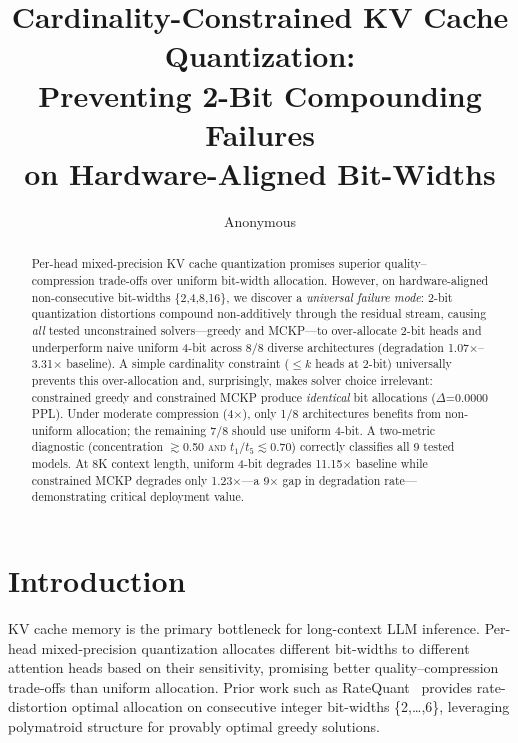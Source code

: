 \documentclass[11pt,a4paper]{article}
\title{Cardinality-Constrained KV Cache Quantization:\\Preventing 2-Bit Compounding Failures\\on Hardware-Aligned Bit-Widths}
\author{Anonymous}
\begin{document}
\maketitle

\begin{abstract}
Per-head mixed-precision KV cache quantization promises superior quality--compression trade-offs over uniform bit-width allocation.
However, on hardware-aligned non-consecutive bit-widths \{2,4,8,16\}, we discover a \emph{universal failure mode}: 2-bit quantization distortions compound non-additively through the residual stream, causing \emph{all} tested unconstrained solvers---greedy and MCKP---to over-allocate 2-bit heads and underperform naive uniform 4-bit across 8/8 diverse architectures (degradation 1.07$\times$--3.31$\times$ baseline).
A simple cardinality constraint ($\le k$ heads at 2-bit) universally prevents this over-allocation and, surprisingly, makes solver choice irrelevant: constrained greedy and constrained MCKP produce \emph{identical} bit allocations ($\Delta$=0.0000 PPL).
Under moderate compression (4$\times$), only 1/8 architectures benefits from non-uniform allocation; the remaining 7/8 should use uniform 4-bit.
A two-metric diagnostic (concentration $\gtrsim$0.50 \textsc{and} $t_1/t_5 \lesssim$0.70) correctly classifies all 9 tested models.
At 8K context length, uniform 4-bit degrades 11.15$\times$ baseline while constrained MCKP degrades only 1.23$\times$---a 9$\times$ gap in degradation rate---demonstrating critical deployment value.
\end{abstract}

\section{Introduction}
\label{sec:intro}

KV cache memory is the primary bottleneck for long-context LLM inference.
Per-head mixed-precision quantization allocates different bit-widths to different attention heads based on their sensitivity, promising better quality--compression trade-offs than uniform allocation.
Prior work such as RateQuant~\cite{ratequant2024} provides rate-distortion optimal allocation on consecutive integer bit-widths \{2,\ldots,6\}, leveraging polymatroid structure for provably optimal greedy solutions.
\end{document}
